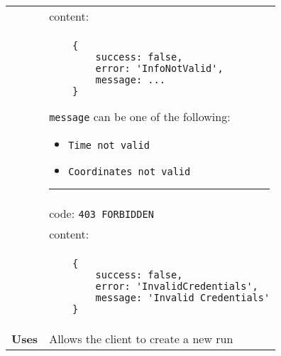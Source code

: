 \begin{adjustwidth}{1cm}{}
\begin{longtable}{|c|l|}
                &                         content: \\
                & \begin{minipage}[t]{0.7\textwidth}
                    \begin{adjustwidth}{1.5cm}{}
                    \begin{verbatim}
    {
        success: false, 
        error: 'InfoNotValid',
        message: ...
    }
                    \end{verbatim}
                    \end{adjustwidth}
                    \texttt{message} can be one of the following: 
                    \begin{itemize}
                        \item \texttt{Time not valid}
                        \item \texttt{Coordinates not valid}
                    \end{itemize}
                     \par\noindent\rule{\textwidth}{1pt}
                 \vspace{4pt}
                  \end{minipage} \\
                & code: \texttt{403 FORBIDDEN} \\
                &                         content: \\
                & \begin{minipage}[t]{0.7\textwidth}
                    \begin{adjustwidth}{1.5cm}{}
                    \begin{verbatim}
    {
        success: false, 
        error: 'InvalidCredentials',
        message: 'Invalid Credentials'
    }
                    \end{verbatim}
                    \end{adjustwidth}
                  \end{minipage} \\
                  \hline
                \textbf{Uses} & Allows the client to create a new run \\
                \hline
            \end{longtable}
        \end{adjustwidth}

